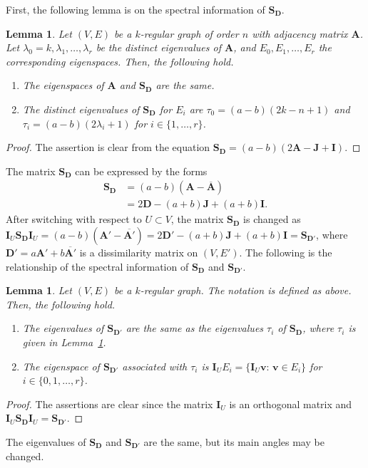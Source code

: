 \documentclass[a4paper, 11pt]{article}
\newcommand{\A}{\boldsymbol{A}}
\newcommand{\J}{\boldsymbol{J}}
\newcommand{\I}{\boldsymbol{I}}
\newcommand{\D}{\boldsymbol{D}}
\newcommand{\Sm}{\boldsymbol{S}}
\newcommand{\vv}{\boldsymbol{v}}
\newtheorem{lemma}[theorem]{Lemma}
\theoremstyle{definition}
\begin{document}
First, the following lemma is on the spectral information of $\Sm_{\D}$. 
\begin{lemma} \label{lem:eigen_SD}
Let $(V,E)$ be a $k$-regular graph of order $n$ with adjacency matrix $\A$. 
 Let $\lambda_0=k,\lambda_1,\ldots,\lambda_r$ be the distinct eigenvalues of $\A$, and  $E_0,E_1,\ldots,E_r$ the corresponding eigenspaces.  
Then, the following hold. 
\begin{enumerate}
\item The eigenspaces of $\A$ 
and $\Sm_{\D}$ are the same. 
\item The distinct eigenvalues of $\Sm_{\D}$ for $E_i$ are 
$\tau_0=(a-b)(2k-n+1)$ and $\tau_i=(a-b)(2\lambda_i+1)$ for $i\in\{1,\ldots,r\}$. 
\end{enumerate}
\end{lemma}
\begin{proof}
The assertion is clear from the equation
$
\Sm_{\D}= (a-b)(2 \A-\J+\I)$. 
\end{proof}
The matrix $\Sm_{\D}$ can be expressed by the forms 
\begin{align*}
\Sm_{\D}&=(a-b)(\A-\overline{\A})\\ 
&=2 \D-(a+b) \J+ (a+b)\I.
\end{align*}
After switching with respect to $U\subset V$, the matrix $\Sm_{\D}$ is changed as    
$\I_U \Sm_{\D} \I_U=(a-b)(\A'-\overline{\A'})=2 \D'-(a+b) \J+ (a+b)\I=\Sm_{\D'}$, where $\D'=a\A'+b\overline{\A'}$ is a dissimilarity matrix on $(V,E')$. 
The following is the relationship of the spectral information of $\Sm_{\D}$ and $\Sm_{\D'}$. 
\begin{lemma}\label{lem:eigen_SD'}
Let $(V,E)$ be a $k$-regular graph. The notation is defined as above.  
Then, the following hold. 
\begin{enumerate}
\item The eigenvalues of  $\Sm_{\D'}$ are the same as the eigenvalues $\tau_i$ of $\Sm_{\D}$, where $\tau_i$ is given in  Lemma~\ref{lem:eigen_SD}.  
\item The eigenspace of $\Sm_{\D'}$ associated with $\tau_i$ is $\I_U E_i=\{\I_U \vv \colon\, \vv \in E_i \}$ for $i\in \{0,1,\ldots, r\}$. 
\end{enumerate}
\end{lemma}
\begin{proof}
The assertions are clear since the matrix $\I_U$ is an orthogonal matrix and $\I_U \Sm_{\D} \I_U=\Sm_{\D'}$.
\end{proof}
The eigenvalues of $\Sm_{\D}$ and $\Sm_{\D'}$ are the same, but its main angles may be changed. 
\end{document}
